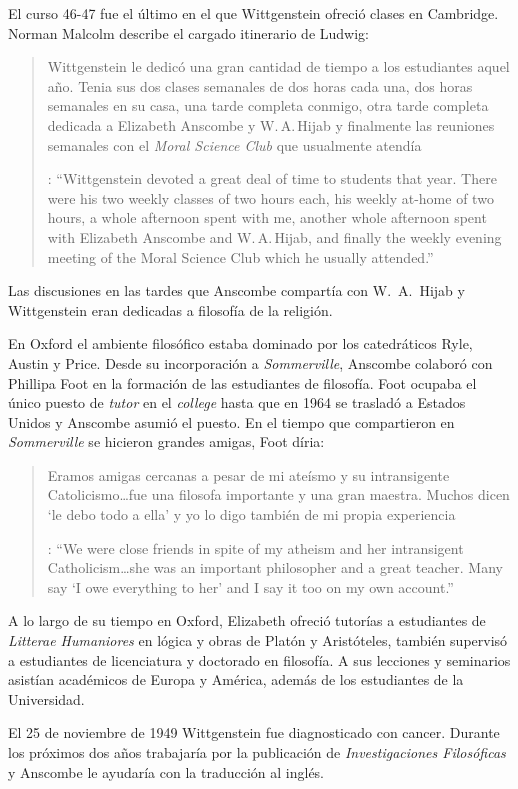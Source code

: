 El curso 46-47 fue el último en el que Wittgenstein ofreció clases en Cambridge. Norman Malcolm describe el cargado itinerario de Ludwig: \blockquote[{\cite[358]{KlaggeNordman2003pubnpriv}}: \enquote{Wittgenstein devoted a great deal of time to students that year. There were his two weekly classes of two hours each, his weekly at-home of two hours, a whole afternoon spent with me, another whole afternoon spent with Elizabeth Anscombe and W.\,A.\,Hijab, and finally the weekly evening meeting of the Moral Science Club which he usually attended.}]{Wittgenstein le dedicó una gran cantidad de tiempo a los estudiantes aquel año. Tenia sus dos clases semanales de dos horas cada una, dos horas semanales en su casa, una tarde completa conmigo, otra tarde completa dedicada a Elizabeth Anscombe y W.\,A.\,Hijab y finalmente las reuniones semanales con el \emph{Moral Science Club} que usualmente atendía}. Las discusiones en las tardes que Anscombe compartía con W.~A.~Hijab y Wittgenstein eran dedicadas a filosofía de la religión.

En Oxford el ambiente filosófico estaba dominado por los catedráticos Ryle, Austin y Price. Desde su incorporación a \emph{Sommerville}, Anscombe colaboró con Phillipa Foot en la formación de las estudiantes de filosofía. Foot ocupaba el único puesto de \emph{tutor} en el \emph{college} hasta que en 1964 se trasladó a Estados Unidos y Anscombe asumió el puesto. En el tiempo que compartieron en \emph{Sommerville} se hicieron grandes amigas, Foot díria: \blockquote[{\cite[35]{teichman2002fellows}}: \enquote{We were close friends in spite of my atheism and her intransigent Catholicism\ldots she was an important philosopher and a great teacher. Many say `I owe everything to her' and I say it too on my own account.}]{Eramos amigas cercanas a pesar de mi ateísmo y su intransigente Catolicismo\ldots fue una filosofa importante y una gran maestra. Muchos dicen `le debo todo a ella' y yo lo digo también de mi propia experiencia}.

A lo largo de su tiempo en Oxford, Elizabeth ofreció tutorías a estudiantes de \emph{Litterae Humaniores} en lógica y obras de Platón y Aristóteles, también supervisó a estudiantes de licenciatura y doctorado en filosofía. A sus lecciones y seminarios asistían académicos de Europa y América, además de los estudiantes de la Universidad\autocite[Cf.~][32]{teichman2002fellows}.

El 25 de noviembre de 1949 Wittgenstein fue diagnosticado con cancer\autocite[Cf.~][559]{monk1991duty}. Durante los próximos dos años trabajaría por la publicación de \emph{Investigaciones Filosóficas} y Anscombe le ayudaría con la traducción al inglés.

